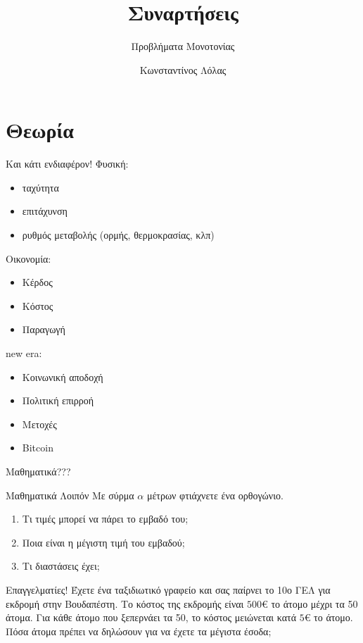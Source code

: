 \documentclass{../presentation}
\title{Συναρτήσεις}
\subtitle{Προβλήματα Μονοτονίας}
\author[Λόλας]{Κωνσταντίνος Λόλας}
\institute[$10^ο$ ΓΕΛ]{$10^ο$ ΓΕΛ Θεσσαλονίκης}
\date{}
\begin{document}
\begin{frame}
  \titlepage
\end{frame}

\section{Θεωρία}
\begin{frame}{Και κάτι ενδιαφέρον!}
  Φυσική:
  \begin{itemize}[<+->]
    \item ταχύτητα
    \item επιτάχυνση
    \item ρυθμός μεταβολής (ορμής, θερμοκρασίας, κλπ)
  \end{itemize}
  Οικονομία:
  \begin{itemize}[<+->]
    \item Κέρδος
    \item Κόστος
    \item Παραγωγή
  \end{itemize}
  new era:
  \begin{itemize}[<+->]
    \item Κοινωνική αποδοχή
    \item Πολιτική επιρροή
    \item Μετοχές
    \item Bitcoin
  \end{itemize}
  Μαθηματικά???
\end{frame}

\begin{askisi}{Μαθηματικά Λοιπόν}
  Με σύρμα $α$ μέτρων φτιάχνετε ένα ορθογώνιο.
  \begin{enumerate}[<+->]
    \item Τι τιμές μπορεί να πάρει το εμβαδό του;
    \item Ποια είναι η μέγιστη τιμή του εμβαδού;
    \item Τι διαστάσεις έχει;
  \end{enumerate}
\end{askisi}

\begin{askisi}{Επαγγελματίες!}
  Έχετε ένα ταξιδιωτικό γραφείο και σας παίρνει το 10ο ΓΕΛ για εκδρομή στην Βουδαπέστη. Το κόστος της εκδρομής είναι $500\euro$ το άτομο μέχρι τα 50 άτομα. Για κάθε άτομο που ξεπερνάει τα 50, το κόστος μειώνεται κατά $5\euro$ το άτομο. Πόσα άτομα πρέπει να δηλώσουν για να έχετε τα μέγιστα έσοδα;
\end{askisi}
\end{document}
